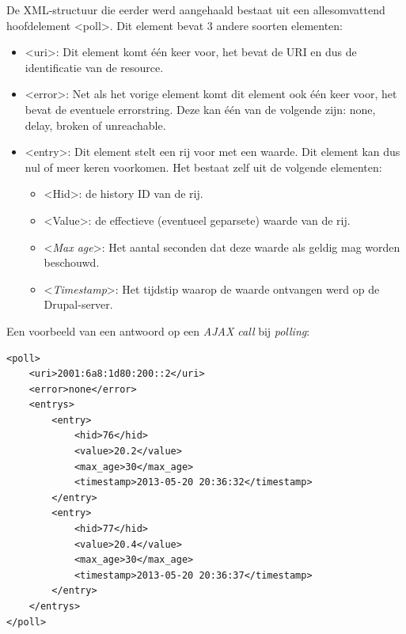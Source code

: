 De XML-structuur die eerder werd aangehaald bestaat uit een allesomvattend hoofdelement \textless poll\textgreater. Dit element bevat 3 andere soorten elementen:
\begin{itemize}
\item \textless uri\textgreater: Dit element komt \'{e}\'{e}n keer voor, het bevat de URI en dus de identificatie van de resource.
\item \textless error\textgreater: Net als het vorige element komt dit element ook \'{e}\'{e}n keer voor, het bevat de eventuele errorstring. Deze kan \'{e}\'{e}n van de volgende zijn: none, delay, broken of unreachable.
\item \textless entry\textgreater: Dit element stelt een rij voor met een waarde. Dit element kan dus nul of meer keren voorkomen. Het bestaat zelf uit de volgende elementen:
\begin{itemize}
\item \textless Hid\textgreater: de history ID van de rij.
\item \textless Value\textgreater: de effectieve (eventueel geparsete) waarde van de rij.
\item \textless \textit{Max age}\textgreater: Het aantal seconden dat deze waarde als geldig mag worden beschouwd.
\item \textless \textit{Timestamp}\textgreater: Het tijdstip waarop de waarde ontvangen werd op de Drupal-server.
\end{itemize}
\end{itemize}

Een voorbeeld van een antwoord op een \textit{AJAX call} bij \textit{polling}:

\scriptsize
\lstset{language=XML}

\begin{lstlisting}[label=xmlPolling,caption=Voorbeeld antwoord op \textit{AJAX call} bij polling]
<poll>
	<uri>2001:6a8:1d80:200::2</uri>
	<error>none</error>
	<entrys>
		<entry>
			<hid>76</hid>
			<value>20.2</value>
			<max_age>30</max_age>
			<timestamp>2013-05-20 20:36:32</timestamp>
		</entry>
		<entry>
			<hid>77</hid>
			<value>20.4</value>
			<max_age>30</max_age>
			<timestamp>2013-05-20 20:36:37</timestamp>
		</entry>
	</entrys>
</poll>
\end{lstlisting}
\normalsize

